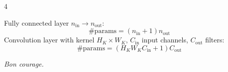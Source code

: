 \documentclass[8pt,a4paper,landscape]{extarticle}
\begin{document}
\begin{multicols*}{4}
\begin{defn}[title=Parameter Counting]
Fully connected layer \(n_{\mathrm{in}}\to n_{\mathrm{out}}\):
\[
\#\mathrm{params}=(n_{\mathrm{in}}+1)n_{\mathrm{out}}
\]
Convolution layer with kernel \(H_K\times W_K\), \(C_{\mathrm{in}}\) input channels, \(C_{\mathrm{out}}\) filters:
\[
\#\mathrm{params}=(H_KW_KC_{\mathrm{in}}+1)C_{\mathrm{out}}
\]
\end{defn}

\vfill
\begin{center}
\textit{Bon courage.}
\end{center}

\end{multicols*}
\end{document}
